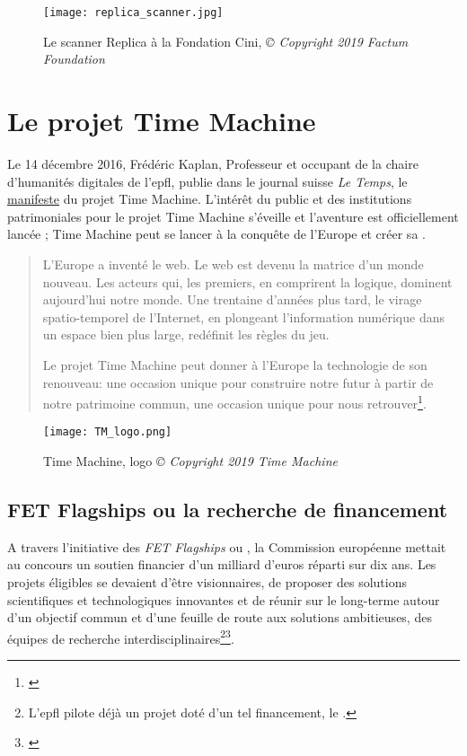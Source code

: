 \begin{figure}[H]%
\centering
\texttt{[image: replica\_scanner.jpg]}
\caption{Le scanner Replica à la Fondation Cini, \textit{© Copyright 2019 Factum Foundation}}
\end{figure}

\section{Le projet Time Machine}

Le 14 décembre 2016, Frédéric Kaplan, Professeur et occupant de la chaire d'humanités digitales de l'\gls{epfl}, publie dans le journal suisse \textit{Le Temps}, le \href{https://www.letemps.ch/opinions/leurope-construire-premiere-time-machine}{manifeste} du projet Time Machine. L'intérêt du public et des institutions patrimoniales pour le projet Time Machine s'éveille et l'aventure est officiellement lancée ; Time Machine peut se lancer à la conquête de l'Europe et créer sa . 

\begin{quotation}
L’Europe a inventé le web. Le web est devenu la matrice d’un monde nouveau. Les acteurs qui, les premiers, en comprirent la logique, dominent aujourd’hui notre monde. Une trentaine d’années plus tard, le virage spatio-temporel de l’Internet, en plongeant l’information numérique dans un espace bien plus large, redéfinit les règles du jeu.

Le projet Time Machine peut donner à l’Europe la technologie de son renouveau: une occasion unique pour construire notre futur à partir de notre patrimoine commun, une occasion unique pour nous retrouver\footnote{\cite{noauthor_leurope_2016}}.
\end {quotation}

\begin{figure}[H]%
\centering
\texttt{[image: TM\_logo.png]}
\caption{Time Machine, logo \textit{© Copyright 2019 Time Machine}}
\end{figure}

\subsection{FET Flagships ou la recherche de financement}\label{fet}
A travers l'initiative des \textit{FET Flagships} ou , la Commission européenne mettait au concours un soutien financier d'un milliard d'euros réparti sur dix ans. Les projets éligibles se devaient d'être visionnaires, de proposer des solutions scientifiques et technologiques innovantes et de réunir sur le long-terme autour d'un objectif commun et d'une feuille de route aux solutions ambitieuses, des équipes de recherche interdisciplinaires\footnote{L'\gls{epfl} pilote déjà un projet doté d'un tel financement, le .}\footnote{\cite{moriscl_fet_2013}}. 

